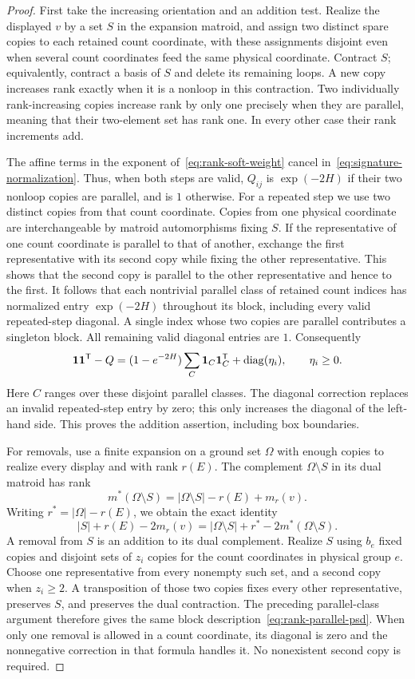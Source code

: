 \begin{proof}
First take the increasing orientation and an addition test.
Realize the displayed $v$ by a set $S$ in the expansion matroid,
and assign two distinct spare copies to each retained count coordinate,
with these assignments disjoint even when several count coordinates
feed the same physical coordinate.
Contract $S$; equivalently, contract a basis of $S$ and delete its
remaining loops.  A new copy increases rank exactly when it is a
nonloop in this contraction.  Two individually rank-increasing
copies increase rank by only one precisely when they are parallel,
meaning that their two-element set has rank one.
In every other case their rank increments add.

The affine terms in the exponent of~\eqref{eq:rank-soft-weight}
cancel in~\eqref{eq:signature-normalization}.  Thus, when both
steps are valid, $Q_{ij}$ is $\exp(-2H)$ if their two nonloop
copies are parallel, and is $1$ otherwise.  For a repeated step
we use two distinct copies from that count coordinate.
Copies from one physical coordinate are interchangeable by matroid
automorphisms fixing $S$.  If the representative of one count coordinate
is parallel to that of another, exchange the first representative
with its second copy while fixing the other representative.
This shows that the second copy is parallel to the other representative
and hence to the first.  It follows that each nontrivial parallel class of retained
count indices has normalized entry $\exp(-2H)$ throughout its
block, including every valid repeated-step diagonal.
A single index whose two copies are parallel contributes a
singleton block.  All remaining valid diagonal entries are $1$.
Consequently
\begin{equation}
 \mathbf 1\mathbf 1^{\mathsf T}-Q
 =(1-e^{-2H})\sum_{C}\mathbf 1_C\mathbf 1_C^{\mathsf T}
       +\operatorname{diag}(\eta_i),\qquad \eta_i\ge0.
 \label{eq:rank-parallel-psd}
\end{equation}
Here $C$ ranges over these disjoint parallel classes.
The diagonal correction replaces an invalid repeated-step entry
by zero; this only increases the diagonal of the left-hand side.
This proves the addition assertion, including box boundaries.

For removals, use a finite expansion on a ground set $\Omega$
with enough copies to realize every display and with rank $r(E)$.
The complement $\Omega\setminus S$ in its dual matroid has rank
\[
 m^*(\Omega\setminus S)=|\Omega\setminus S|-r(E)+m_r(v).
\]
Writing $r^*=|\Omega|-r(E)$, we obtain the exact identity
\[
 |S|+r(E)-2m_r(v)
 =|\Omega\setminus S|+r^*-2m^*(\Omega\setminus S).
\]
A removal from $S$ is an addition to its dual complement.
Realize $S$ using $b_e$ fixed copies and disjoint sets of $z_i$
copies for the count coordinates in physical group $e$.
Choose one representative from every nonempty such set, and a second
copy when $z_i\ge2$.  A transposition of those two copies fixes
every other representative, preserves $S$, and preserves the dual
contraction.  The preceding parallel-class argument therefore gives
the same block description~\eqref{eq:rank-parallel-psd}.
When only one removal is allowed in a count coordinate, its diagonal
is zero and the nonnegative correction in that formula handles it.
No nonexistent second copy is required.


\end{proof}
